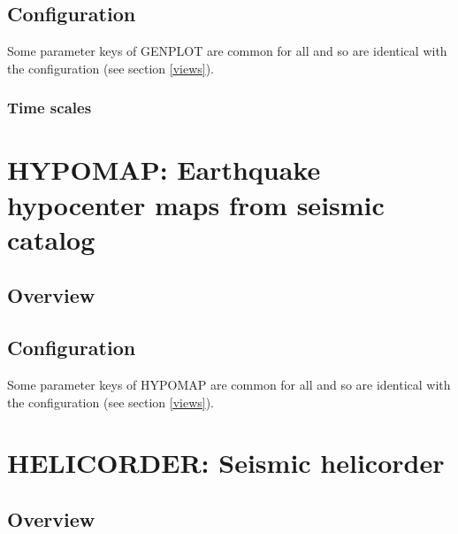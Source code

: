 \subsection{Configuration}

Some parameter keys of GENPLOT are common for all  and  so are identical with the  configuration (see section \ref{views}).



\subsubsection{Time scales}



\section{HYPOMAP: Earthquake hypocenter maps from seismic catalog}

\subsection{Overview}

\subsection{Configuration}

Some parameter keys of HYPOMAP are common for all  and  so are identical with the  configuration (see section \ref{views}).




\section{HELICORDER: Seismic helicorder}

\subsection{Overview}

